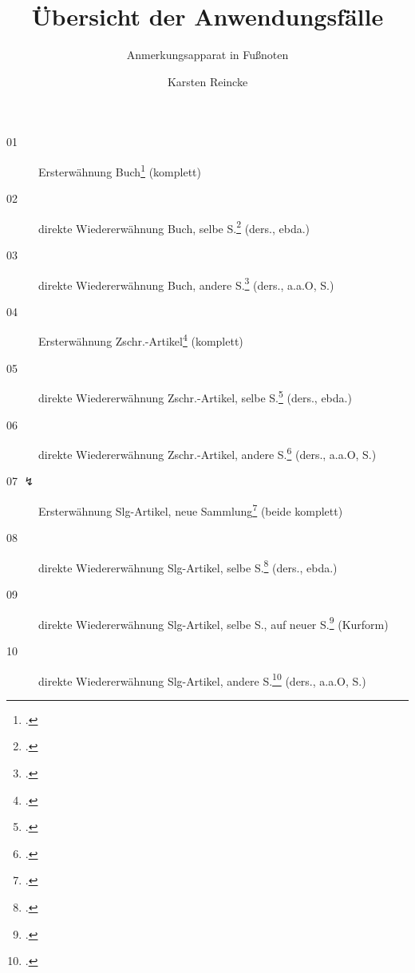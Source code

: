 \documentclass[
  DIV=calc,
  BCOR=5mm,
  11pt,
  smallheadings,
  oneside,
  abstract=true,
  toc=bib]{scrartcl}
\begin{document}
\nocite{*}

\titlehead{mycsrf.verify-: Deutsch}
\subject{(Geistes-) Wissenschaftliche Texte mit modifiziertem \textit{jurabib}}
\title{Übersicht der Anwendungsfälle}
\subtitle{Anmerkungsapparat in Fußnoten}
\author{Karsten Reincke}

\maketitle


\begin{description}

  \item[01 \checkmark] Ersterwähnung
    Buch\footcite[vgl.][12]{KantKdU1974} (komplett) 
  \item[02 \checkmark] direkte Wiedererwähnung
    Buch, selbe S.\footcite[vgl.][12]{KantKdU1974} (ders., ebda.)
  \item[03 \checkmark] direkte Wiedererwähnung
    Buch, andere S.\footcite[vgl.][13]{KantKdU1974} (ders., a.a.O, S.)
  \item[04 \checkmark] Ersterwähnung
    Zschr.-Artikel\footcite[vgl.][12]{McCarthy1980a} (komplett)
  \item[05 \checkmark] direkte Wiedererwähnung
    Zschr.-Artikel,
      selbe S.\footcite[vgl.][12]{McCarthy1980a} (ders., ebda.)
  \item[06 \checkmark] direkte Wiedererwähnung
    Zschr.-Artikel, 
      andere S.\footcite[vgl.][13]{McCarthy1980a} (ders., a.a.O, S.)
  
  \item[07 $\lightning$] Ersterwähnung 
    Slg-Artikel,
      neue Sammlung\footcite[vgl.][12]{Hays1985a} (beide komplett)
  \item[08 \checkmark] direkte Wiedererwähnung
    Slg-Artikel,
      selbe S.\footcite[vgl.][12]{Hays1985a} (ders., ebda.)
      
 \item[09 \checkmark] direkte Wiedererwähnung
    Slg-Artikel,
      selbe S.,
       auf neuer S.\footcite[vgl.][12]{Hays1985a} (Kurform)
  \item[10 \checkmark] direkte Wiedererwähnung
    Slg-Artikel,
      andere S.\footcite[vgl.][13]{Hays1985a} (ders., a.a.O, S.)
     

\end{description}
\end{document}

